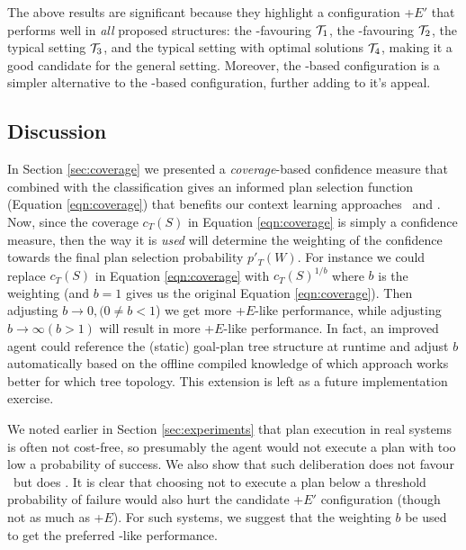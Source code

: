 The above results are significant because they highlight a configuration \CL+$E'$ that performs well in \textit{all} proposed structures: the \CL-favouring ${\mathcal{T}}_1$, the \BUL-favouring ${\mathcal{T}}_2$, the typical setting ${\mathcal{T}}_3$, and the typical setting with optimal solutions ${\mathcal{T}}_4$, making it a good candidate for the general setting. Moreover, the \CL-based configuration is a simpler alternative to the \BUL-based configuration, further adding to it's appeal.


\subsection{Discussion}

In Section \ref{sec:coverage} we presented a \textit{coverage}-based confidence measure that combined with the \dt classification gives an informed plan selection function (Equation \ref{eqn:coverage}) that benefits our context learning approaches \CL\ and \BUL. Now, since the coverage $c_T(S)$ in Equation \ref{eqn:coverage} is simply a confidence measure, then the way it is \textit{used} will determine the weighting of the confidence towards the final plan selection probability $p'_T(W)$. For instance we could replace $c_T(S)$ in Equation \ref{eqn:coverage} with $c_T(S)^{1/b}$ where $b$ is the weighting (and $b=1$ gives us the original Equation \ref{eqn:coverage}). Then adjusting $b \rightarrow 0, (0 \ne b < 1$) we get more \BUL+$E$-like performance, while adjusting $b \rightarrow \infty (b > 1)$ will result in more \CL+$E$-like performance. In fact, an improved agent could reference the (static) goal-plan tree structure at runtime and adjust $b$ automatically based on the offline compiled knowledge of which approach works better for which tree topology. This extension is left as a future implementation exercise.

We noted earlier in Section \ref{sec:experiments} that plan execution in real systems is often not cost-free, so presumably the agent would not execute a plan with too low a probability of success. We also show that such deliberation does not favour \CL\ but does \BUL. It is clear that choosing not to execute a plan below a threshold probability of failure would also hurt the candidate \CL+$E'$ configuration (though not as much as \CL+$E$). For such systems, we suggest that the weighting $b$ be used to get the preferred \BUL-like performance.

